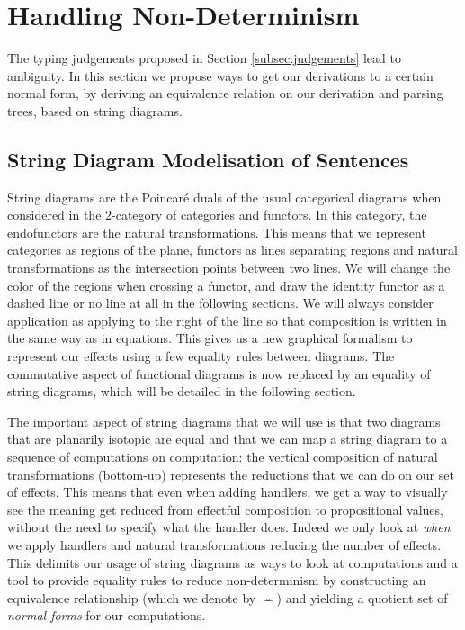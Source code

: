 \section{Handling Non-Determinism}
\label{sec:nondet}
The typing judgements proposed in Section \ref{subsec:judgements} lead to
ambiguity.
In this section we propose ways to get our derivations to a certain normal
form, by deriving an equivalence relation on our derivation and parsing
trees, based on string diagrams.

\subsection{String Diagram Modelisation of Sentences}
\label{subsec:sd}
String diagrams are the Poincaré duals of the usual categorical diagrams when
considered in the $2$-category of categories and functors.
In this category, the endofunctors are the natural transformations.
This means that we represent categories as regions of the plane, functors as
lines separating regions and natural transformations as the intersection points
between two lines.
We will change the color of the regions when crossing a functor, and draw the identity functor as a dashed line or no line at all in the following sections.
We will always consider application as applying to the right of the line so that composition is written in the same way as in equations.
This gives us a new graphical formalism to represent our effects using a few equality rules between diagrams.
The commutative aspect of functional diagrams is now replaced by an equality of string diagrams, which will be detailed in the following section.

The important aspect of string diagrams that we will use is that two diagrams
that are planarily isotopic are equal \cite{joyalGeometryTensorCalculus1991}
and that we can map a string diagram to a sequence of computations on
computation: the vertical composition of natural transformations (bottom-up)
represents the reductions that we can do on our set of effects.
This means that even when adding handlers, we get a way to visually see the
meaning get reduced from effectful composition to propositional values, without
the need to specify what the handler does.
Indeed we only look at \emph{when} we apply handlers and natural
transformations reducing the number of effects.
This delimits our usage of string diagrams as ways to look at computations and
a tool to provide equality rules to reduce non-determinism by constructing an
equivalence relationship (which we denote by $\eqcirc$) and yielding a quotient
set of \emph{normal forms} for our computations.

